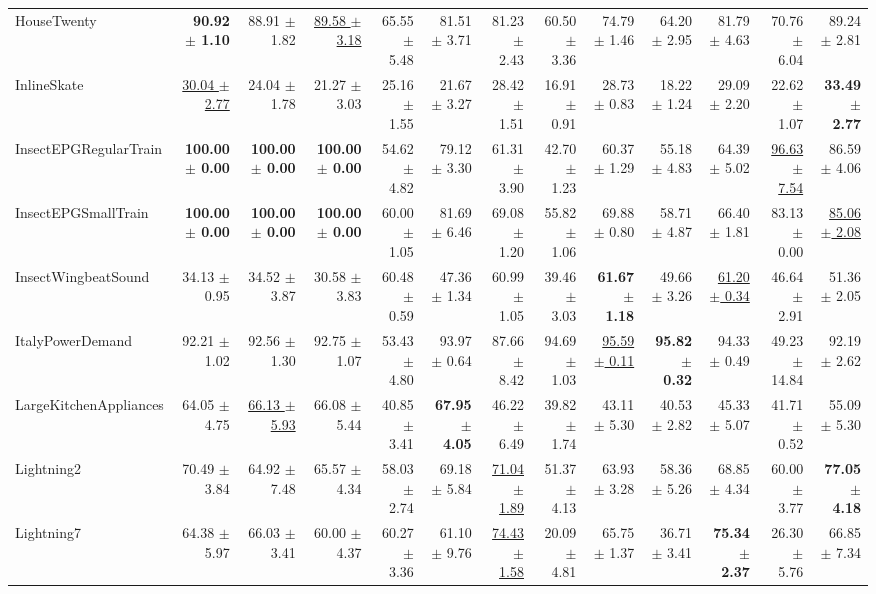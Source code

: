 \begin{landscape}
\begin{longtable}{lrrrrrrrrrrrr}
HouseTwenty & \textbf{90.92 $\pm$ 1.10} & 88.91 $\pm$ 1.82 & \underline{89.58 $\pm$ 3.18} & 65.55 $\pm$ 5.48 & 81.51 $\pm$ 3.71 & 81.23 $\pm$ 2.43 & 60.50 $\pm$ 3.36 & 74.79 $\pm$ 1.46 & 64.20 $\pm$ 2.95 & 81.79 $\pm$ 4.63 & 70.76 $\pm$ 6.04 & 89.24 $\pm$ 2.81 \\
InlineSkate & \underline{30.04 $\pm$ 2.77} & 24.04 $\pm$ 1.78 & 21.27 $\pm$ 3.03 & 25.16 $\pm$ 1.55 & 21.67 $\pm$ 3.27 & 28.42 $\pm$ 1.51 & 16.91 $\pm$ 0.91 & 28.73 $\pm$ 0.83 & 18.22 $\pm$ 1.24 & 29.09 $\pm$ 2.20 & 22.62 $\pm$ 1.07 & \textbf{33.49 $\pm$ 2.77} \\
InsectEPGRegularTrain & \textbf{100.00 $\pm$ 0.00} & \textbf{100.00 $\pm$ 0.00} & \textbf{100.00 $\pm$ 0.00} & 54.62 $\pm$ 4.82 & 79.12 $\pm$ 3.30 & 61.31 $\pm$ 3.90 & 42.70 $\pm$ 1.23 & 60.37 $\pm$ 1.29 & 55.18 $\pm$ 4.83 & 64.39 $\pm$ 5.02 & \underline{96.63 $\pm$ 7.54} & 86.59 $\pm$ 4.06 \\
InsectEPGSmallTrain & \textbf{100.00 $\pm$ 0.00} & \textbf{100.00 $\pm$ 0.00} & \textbf{100.00 $\pm$ 0.00} & 60.00 $\pm$ 1.05 & 81.69 $\pm$ 6.46 & 69.08 $\pm$ 1.20 & 55.82 $\pm$ 1.06 & 69.88 $\pm$ 0.80 & 58.71 $\pm$ 4.87 & 66.40 $\pm$ 1.81 & 83.13 $\pm$ 0.00 & \underline{85.06 $\pm$ 2.08} \\
InsectWingbeatSound & 34.13 $\pm$ 0.95 & 34.52 $\pm$ 3.87 & 30.58 $\pm$ 3.83 & 60.48 $\pm$ 0.59 & 47.36 $\pm$ 1.34 & 60.99 $\pm$ 1.05 & 39.46 $\pm$ 3.03 & \textbf{61.67 $\pm$ 1.18} & 49.66 $\pm$ 3.26 & \underline{61.20 $\pm$ 0.34} & 46.64 $\pm$ 2.91 & 51.36 $\pm$ 2.05 \\
ItalyPowerDemand & 92.21 $\pm$ 1.02 & 92.56 $\pm$ 1.30 & 92.75 $\pm$ 1.07 & 53.43 $\pm$ 4.80 & 93.97 $\pm$ 0.64 & 87.66 $\pm$ 8.42 & 94.69 $\pm$ 1.03 & \underline{95.59 $\pm$ 0.11} & \textbf{95.82 $\pm$ 0.32} & 94.33 $\pm$ 0.49 & 49.23 $\pm$ 14.84 & 92.19 $\pm$ 2.62 \\
LargeKitchenAppliances & 64.05 $\pm$ 4.75 & \underline{66.13 $\pm$ 5.93} & 66.08 $\pm$ 5.44 & 40.85 $\pm$ 3.41 & \textbf{67.95 $\pm$ 4.05} & 46.22 $\pm$ 6.49 & 39.82 $\pm$ 1.74 & 43.11 $\pm$ 5.30 & 40.53 $\pm$ 2.82 & 45.33 $\pm$ 5.07 & 41.71 $\pm$ 0.52 & 55.09 $\pm$ 5.30 \\
Lightning2 & 70.49 $\pm$ 3.84 & 64.92 $\pm$ 7.48 & 65.57 $\pm$ 4.34 & 58.03 $\pm$ 2.74 & 69.18 $\pm$ 5.84 & \underline{71.04 $\pm$ 1.89} & 51.37 $\pm$ 4.13 & 63.93 $\pm$ 3.28 & 58.36 $\pm$ 5.26 & 68.85 $\pm$ 4.34 & 60.00 $\pm$ 3.77 & \textbf{77.05 $\pm$ 4.18} \\
Lightning7 & 64.38 $\pm$ 5.97 & 66.03 $\pm$ 3.41 & 60.00 $\pm$ 4.37 & 60.27 $\pm$ 3.36 & 61.10 $\pm$ 9.76 & \underline{74.43 $\pm$ 1.58} & 20.09 $\pm$ 4.81 & 65.75 $\pm$ 1.37 & 36.71 $\pm$ 3.41 & \textbf{75.34 $\pm$ 2.37} & 26.30 $\pm$ 5.76 & 66.85 $\pm$ 7.34 \\

\end{longtable}
\end{landscape}
